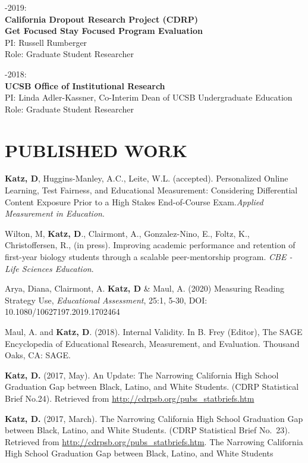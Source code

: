 \documentclass[12pt, oneside,]{memoir}
\begin{document}
-2019:\\
\textbf{California Dropout Research Project (CDRP)}\\
\textbf{Get Focused Stay Focused Program Evaluation}\\
\hspace*{0.333em}\hspace*{0.333em}PI: Russell Rumberger\\
\hspace*{0.333em}\hspace*{0.333em}Role: Graduate Student Researcher

-2018:\\
\textbf{UCSB Office of Institutional Research}\\
\hspace*{0.333em}\hspace*{0.333em}PI: Linda Adler-Kassner, Co-Interim
Dean of UCSB Undergraduate Education\\
\hspace*{0.333em}\hspace*{0.333em}Role: Graduate Student Researcher
\vspace{4mm}

\hypertarget{published-work}{%
\section{PUBLISHED WORK}\label{published-work}}
\begin{hangparas}{.25in}{1}

\textbf{Katz, D}, Huggins-Manley, A.C., Leite, W.L. (accepted). Personalized Online Learning, Test Fairness, and Educational Measurement: Considering Differential Content Exposure Prior to a High Stakes End-of-Course Exam.\emph{Applied Measurement in Education}.

Wilton, M, \textbf{Katz, D}., Clairmont, A., Gonzalez-Nino, E., Foltz, K., Christoffersen, R., (in press). Improving academic performance and retention of first-year biology students through a scalable peer-mentorship program. \emph{CBE - Life Sciences Education}.

Arya, Diana, Clairmont, A. \textbf{Katz, D} \& Maul, A. (2020) Measuring
Reading Strategy Use, \emph{Educational  Assessment}, 25:1, 5-30, DOI:
10.1080/10627197.2019.1702464

\noindent Maul, A. and \textbf{Katz, D}. (2018). Internal Validity. In B. Frey
(Editor), The SAGE Encyclopedia of Educational Research, Measurement,
and Evaluation. Thousand Oaks, CA: SAGE.

\noindent \textbf{Katz, D.} (2017, May). An Update: The Narrowing California High
School Graduation Gap between Black, Latino, and White Students. (CDRP
Statistical Brief No.24). Retrieved from
\url{http://cdrpsb.org/pubs_statbriefs.htm}

\noindent \textbf{Katz, D.} (2017, March). The Narrowing California High School
Graduation Gap between Black, Latino, and White Students. (CDRP
Statistical Brief No.~23). Retrieved from
\url{http://cdrpsb.org/pubs_statbriefs.htm}. The Narrowing California
High School Graduation Gap between Black, Latino, and White Students
\end{hangparas}
\vspace{4mm}
\end{document}
